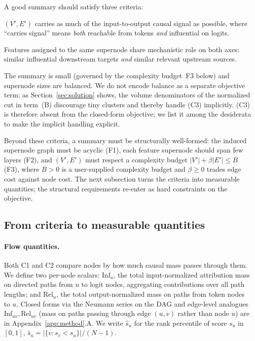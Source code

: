 \documentclass[table, 11pt]{article}
\begin{document}
A good summary should satisfy three criteria:
\begin{description}[leftmargin=2.2em,style=nextline,topsep=2pt,itemsep=2pt]
\item[(C1) Faithfulness.] $(V', E')$ carries as much of the
input-to-output causal signal as possible, where ``carries signal''
means \emph{both} reachable from tokens \emph{and} influential on
logits.
\item[(C2) Coherence.] Features assigned to the same supernode share
mechanistic role on both axes: similar influential downstream
targets \emph{and} similar relevant upstream sources.
\item[(C3) Readability.] The summary is small (governed by the
complexity budget~F3 below) and supernode sizes are balanced. We do
not encode balance as a separate objective term; as
Section~\ref{sec:solution} shows, the volume denominators of the
normalized cut in term~(B) discourage tiny clusters and thereby
handle (C3) implicitly. (C3) is therefore absent from the
closed-form objective; we list it among the desiderata to make the
implicit handling explicit.
\end{description}

Beyond these criteria, a summary must be structurally well-formed:
the induced supernode graph must be acyclic (F1), each feature
supernode should span few layers (F2), and $(V', E')$ must respect a
complexity budget $|V'| + \beta|E'| \le B$ (F3), where $B > 0$ is a
user-supplied complexity budget and $\beta \ge 0$ trades edge cost
against node cost. The next subsection turns the criteria into
measurable quantities; the structural requirements re-enter as hard
constraints on the objective.

\subsection{From criteria to measurable quantities}\label{sec:operationalize}

\paragraph{Flow quantities.}
Both C1 and C2 compare nodes by how much causal mass passes through
them. We define two per-node scalars: $\text{Inf}_u$, the total
input-normalized attribution mass on directed paths from $u$ to
logit nodes, aggregating contributions over all path lengths; and
$\text{Rel}_u$, the total output-normalized mass on paths from
token nodes to $u$. Closed forms via the Neumann series on the DAG
and edge-level analogues $\text{Inf}_{uv}, \text{Rel}_{uv}$ (mass on
paths passing through edge $(u,v)$ rather than node $u$) are in
Appendix~\ref{app:method}.A. We write $\widehat{s}_u$ for the rank
percentile of score $s_u$ in $[0,1]$,
$\widehat{s}_u = |\{v : s_v < s_u\}|/(N - 1)$.
\end{document}
